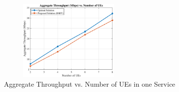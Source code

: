 \documentclass[lettersize,journal]{IEEEtran}
\begin{document}
\begin{figure}%
  \centering
  \captionsetup{justification=centering}
   \includegraphics[width=7cm,height=4cm]{optimal1.eps}
  \caption{Aggregate Throughput vs. Number of UEs in one Service}
  \label{fig:12}
\end{figure}

\end{document}
